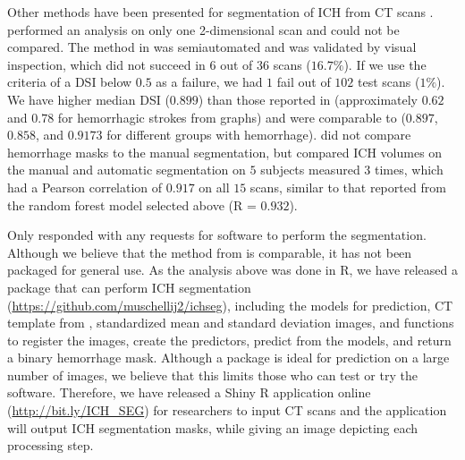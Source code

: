 Other methods have been presented for segmentation of ICH from CT scans \citep{ gillebert_automated_2014, prakash_segmentation_2012, loncaric_hierarchical_1996, loncaric_quantitative_1999, perez_set_2007}.  \citet{loncaric_hierarchical_1996} performed an analysis on only one 2-dimensional scan and could not be compared.  The method in \citet{perez_set_2007} was semiautomated and was validated by visual inspection, which did not succeed in $6$ out of $36$ scans ($16.7\%$).  If we use the criteria of a DSI below $0.5$ as a failure, we had $1$ fail out of $102$ test scans ($1\%$).  We have higher median DSI ($0.899$) than those reported in \citet{gillebert_automated_2014} (approximately $0.62$ and $0.78$ for hemorrhagic strokes from graphs) and were comparable to \citep{prakash_segmentation_2012} ($0.897$, $0.858$, and $0.9173$ for different groups with hemorrhage). \citet{loncaric_quantitative_1999} did not compare hemorrhage masks to the manual segmentation, but compared ICH volumes on the manual and automatic segmentation on $5$ subjects measured $3$ times, which had a Pearson correlation of $0.917$ on all $15$ scans, similar to that reported from the random forest model selected above (R = $0.932$).  

Only \citet{gillebert_automated_2014} responded with any requests for software to perform the segmentation.  Although we believe that the method from \citet{gillebert_automated_2014} is comparable, it has not been packaged for general use.  As the analysis above was done in R, we have released a package that can perform ICH segmentation (\url{https://github.com/muschellij2/ichseg}), 
including the models for prediction, CT template from \citet{rorden_age-specific_2012}, standardized mean and standard deviation images, and functions to register the images, create the predictors, predict from the models, and return a binary hemorrhage mask.  Although a package is ideal for prediction on a large number of images, we believe that this limits those who can test or try the software.  Therefore, we have released a Shiny \citep{shiny} R application online (\url{http://bit.ly/ICH_SEG}) for researchers to input CT scans and the application will output ICH segmentation masks, while giving an image depicting each processing step.  

